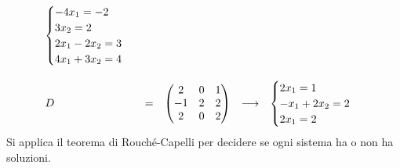\documentclass[a4paper]{article}
\makeatletter
\newenvironment{rowequmat}[1]{\left(\array{@{}#1@{}}}{\endarray\right)}
\makeatother
\begin{document}
\begin{equation*}
\begin{array}{lllll}
\begin{cases}
				-4x_{1} = -2 \\
				3x_{2} = 2 \\
				2x_{1} - 2x_{2} = 3 \\
				4x_{1} + 3x_{2} = 4
			\end{cases} \\
			\\
			D & = & \begin{rowequmat}{ccc}
				2 & 0 & 1 \\
				-1 & 2 & 2 \\
				2 & 0 & 2
			\end{rowequmat} & \longrightarrow & \begin{cases}
				2x_{1} = 1 \\
				-x_{1} + 2x_{2} = 2 \\
				2x_{1} = 2
			\end{cases}
		\end{array}
	\end{equation*}
	Si applica il teorema di Rouché-Capelli per decidere se ogni sistema ha o non ha soluzioni.\newpage
	
\end{document}
